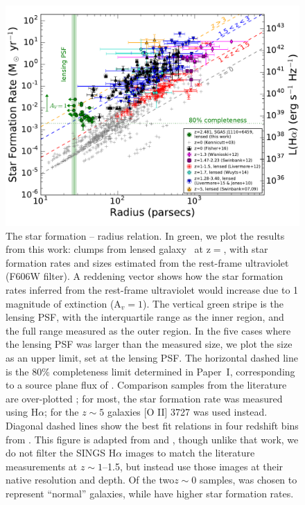 \begin{figure}
\includegraphics[width=\textwidth,angle=0]{Chap5/f2.pdf} %
\caption{The star formation -- radius relation.  
In green, we plot the results from this work:
clumps from lensed galaxy  \giantarc\ at z$=$\zA,  
with star formation rates and sizes estimated 
from the rest-frame ultraviolet (F606W filter).  A reddening vector shows how the 
star formation rates inferred from the rest-frame ultraviolet would increase 
due to 1 magnitude of extinction (A$_v=1$).
The vertical green stripe is the lensing PSF, with the interquartile range 
as the inner region, and the full range measured as the outer region. 
In the five cases
where the lensing PSF was larger than the measured size,
we plot the size as an upper limit, set at the lensing PSF. 
The horizontal dashed line is the $80\%$ completeness limit determined
in Paper~I, corresponding to a source plane flux of \fluxcompleteness.
Comparison samples from the literature are over-plotted 
\citep{Swinbank:2007wj, Swinbank:2009lk, Jones:2010uq, Wisnioski:2012qf, 
Livermore:2012fk, Swinbank:2012jk, Wuyts:2014uq, Livermore:2015ve, Fisher:2017tk}; 
for most,   the star formation rate was measured using H$\alpha$; 
for the $z\sim5$ galaxies [O II] 3727 was used instead.  
Diagonal dashed lines show the best fit relations in four redshift bins
from \citet{Livermore:2015ve}.
This figure is adapted from \citet{Livermore:2012fk} and \citet{Livermore:2015ve}, 
though unlike that work, we do not filter the SINGS H$\alpha$ images 
\citep{Kennicutt:2003xq} to 
match the literature measurements at $z\sim1$--1.5, but instead
use those images at their native resolution and depth.
Of the two$z\sim0$ samples, \citet{Kennicutt:2003xq}  was chosen 
to represent ``normal'' galaxies, while \citet{Fisher:2017tk} have  
higher star formation rates.
}
\label{chap5:fig:surfacedensity}
\end{figure}


